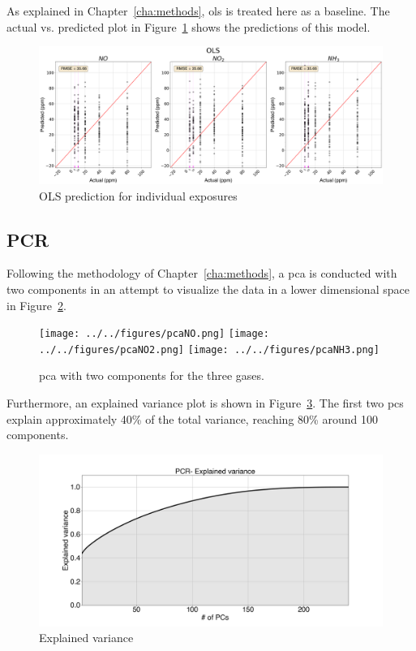 As explained in Chapter~\ref{cha:methods}, \acrshort{ols} is treated here as a baseline. The actual vs. predicted plot in Figure~\ref{fig:ols-exposures} shows the predictions of this model.

\begin{figure}[h]
	\centering
	\includegraphics[width=1\textwidth]{../figures/ols-exposures.png}
	\caption{OLS prediction for individual exposures}
	\label{fig:ols-exposures}
\end{figure}

\subsection{PCR}
\label{subsec:pcr1}

Following the methodology of Chapter~\ref{cha:methods}, a \acrshort{pca} is conducted with two components in an attempt to visualize the data in a lower dimensional space in Figure~\ref{fig:pca}. 

\begin{figure}[!htb]
	\centering
	\texttt{[image: ../../figures/pcaNO.png]}
	\hfill
	\texttt{[image: ../../figures/pcaNO2.png]}
	\hfill
	\texttt{[image: ../../figures/pcaNH3.png]}
	\caption{\acrshort{pca} with two components for the three gases.}
	
\label{fig:pca}
\end{figure}

Furthermore, an explained variance plot is shown in Figure~\ref{fig:pcr-exp-var}. The first two \acrshort{pc}s explain approximately 40\% of the total variance, reaching 80\% around 100 components.

\begin{figure}[h]
	\centering
	\includegraphics[width=1\textwidth]{../figures/pcr-explained-variance.png}
	\caption{Explained variance}
	\label{fig:pcr-exp-var}
\end{figure}

